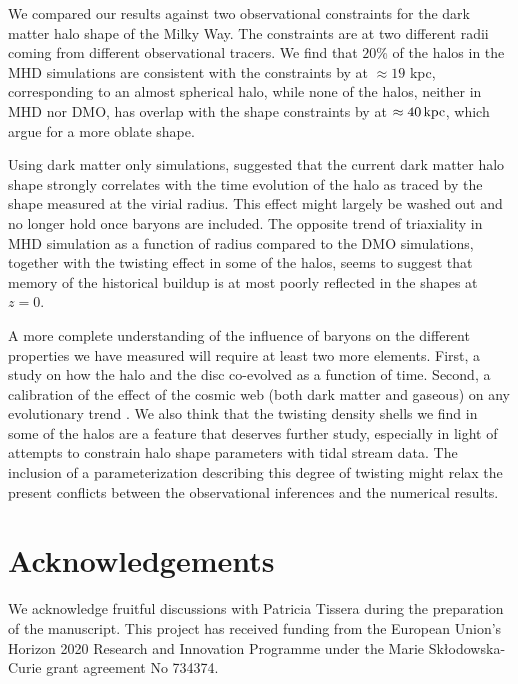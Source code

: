 \documentclass[usenatbib]{mnras}
\begin{document}
We compared our results against two observational constraints for the
dark matter halo shape of the Milky Way. The constraints are at two different radii
coming from different observational tracers. 
We find that $20\%$ of the halos in the MHD simulations are consistent with
the constraints by \cite{Bovy16} at $\approx 19$ kpc,  corresponding to
an almost spherical halo, while none of the halos, neither in MHD nor
DMO, has overlap with the shape constraints by \cite{LM10} at
$\approx 40\,{\rm kpc}$, which argue for a more oblate shape.

Using dark matter only simulations, \citet{VeraCiro11} suggested that
the current dark matter halo shape strongly correlates with the time
evolution of the halo as traced by the shape measured at the virial radius. 
This effect might largely be washed out and no longer hold once baryons are included. 
The opposite trend of triaxiality in MHD simulation as a function of
radius compared to the DMO simulations, together with the twisting effect in some of 
the halos, seems to suggest that memory of the historical buildup is at most poorly 
reflected in the shapes at $z=0$.


A more complete understanding of the influence of baryons on the
different properties we have measured will require at least two more elements.
First, a study on how the halo and the disc co-evolved as a
function of time. Second, a calibration of the effect of the cosmic web
(both dark matter and gaseous) on any evolutionary trend
\citep{2014MNRAS.443.1090F, 2017MNRAS.469..594B, 2019MNRAS.487.1607G}.
We also think  that the twisting density shells we find in
some of the halos are a feature that deserves further study, especially
in light of attempts to  constrain halo shape parameters with tidal stream data.  The
inclusion of a parameterization describing this degree of twisting
might relax the present conflicts between the observational inferences and the
numerical results.  


\section*{Acknowledgements}
We acknowledge fruitful discussions with Patricia Tissera during the
preparation of the manuscript.
This project has received funding from the European Union's Horizon
2020 Research and Innovation Programme under the Marie
Sk\l{}odowska-Curie grant agreement No 734374. 



\end{document}
